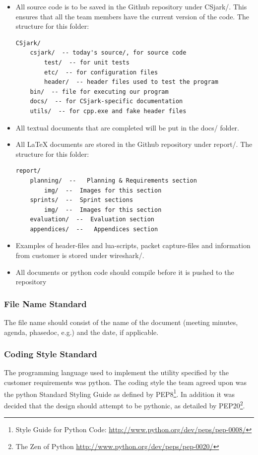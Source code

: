 \begin{itemize}
	\item All source code is to be saved in the Github \gls{repository} under
		CSjark/. This ensures that all the team members have the current
		version of the code. The structure for this folder:
		\begin{verbatim}
CSjark/
    csjark/  -- today's source/, for source code
        test/  -- for unit tests
        etc/  -- for configuration files
        header/  -- header files used to test the program
    bin/  -- file for executing our program
    docs/  -- for CSjark-specific documentation
    utils/  -- for cpp.exe and fake header files
		\end{verbatim}
	\item All textual documents that are completed will be put in the
		docs/ folder.
	\item All LaTeX documents are stored in the Github \gls{repository}
		under report/. The structure for this folder:
		\begin{verbatim}
report/
    planning/  --   Planning & Requirements section
        img/  --  Images for this section
    sprints/  --  Sprint sections
        img/  --  Images for this section
    evaluation/  --  Evaluation section
    appendices/  --   Appendices section
		\end{verbatim}
	\item Examples of \gls{header}-files and \Gls{lua}-\glspl{script}, \gls{packet} capture-files and information from customer is stored under \Gls{wireshark}/.
	\item All documents or python code should compile before it is pushed to the repository
\end{itemize}

\subsubsection{File Name Standard}
The file name should consist of the name of the document (meeting minutes,
agenda, phasedoc, e.g.) and the date, if applicable.

\subsubsection{Coding Style Standard}
The programming language used to implement the utility specified by the
customer requirements was \Gls{python}. The coding style the team agreed upon was
the \Gls{python} Standard Styling Guide as defined by
PEP8\footnote{Style Guide for Python Code: \url{http://www.python.org/dev/peps/pep-0008/}}.
In addition it was decided that the design should attempt to be pythonic, as detailed by
PEP20\footnote{The Zen of Python \url{http://www.python.org/dev/peps/pep-0020/}}.

